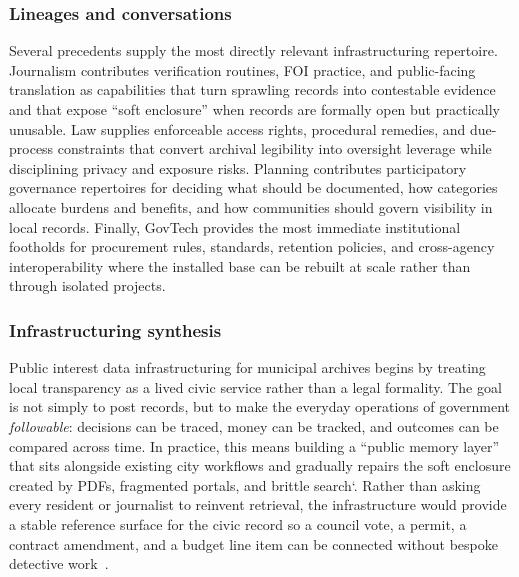 \documentclass[acmsmall,screen]{acmart}
\begin{document}
\subsubsection*{Lineages and conversations}
Several precedents supply the most directly relevant infrastructuring repertoire. Journalism contributes verification routines, FOI practice, and public-facing translation as capabilities that turn sprawling records into contestable evidence and that expose ``soft enclosure'' when records are formally open but practically unusable. Law supplies enforceable access rights, procedural remedies, and due-process constraints that convert archival legibility into oversight leverage while disciplining privacy and exposure risks. Planning contributes participatory governance repertoires for deciding what should be documented, how categories allocate burdens and benefits, and how communities should govern visibility in local records. Finally, GovTech provides the most immediate institutional footholds for procurement rules, standards, retention policies, and cross-agency interoperability where the installed base can be rebuilt at scale rather than through isolated projects.

\subsubsection*{Infrastructuring synthesis}
Public interest data infrastructuring for municipal archives begins by treating local transparency as a lived civic service rather than a legal formality. The goal is not simply to post records, but to make the everyday operations of government \textit{followable}: decisions can be traced, money can be tracked, and outcomes can be compared across time. In practice, this means building a ``public memory layer'' that sits alongside existing city workflows and gradually repairs the soft enclosure created by PDFs, fragmented portals, and brittle search`\cite{brownCouncilDataProject2021}. Rather than asking every resident or journalist to reinvent retrieval, the infrastructure would provide a stable reference surface for the civic record so a council vote, a permit, a contract amendment, and a budget line item can be connected without bespoke detective work~\cite{barariLocalViewDatabasePublic2023}.
\end{document}
